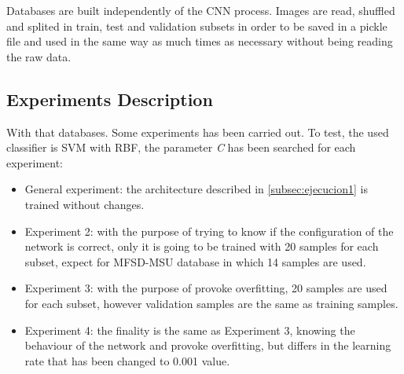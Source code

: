 Databases are built independently of the CNN process. Images are read, shuffled and splited in train, test and validation subsets in order to be saved in a pickle file and used in the same way as much times as necessary without being reading the raw data.

\subsection{Experiments Description} \label{sec:experiments_ejec1}
With that databases. Some experiments has been carried out. To test, the used classifier is SVM with RBF, the parameter \textit{C} has been searched for each experiment:
\begin{itemize}
\item General experiment: the architecture described in \ref{subsec:ejecucion1} is trained without changes.
\item Experiment 2: with the purpose of trying to know if the configuration of the network is correct, only it is going to be trained with 20 samples for each subset, expect for MFSD-MSU database in which 14 samples are used.
\item Experiment 3: with the purpose of provoke overfitting, 20 samples are used for each subset, however validation samples are the same as training samples.
\item Experiment 4: the finality is the same as Experiment 3, knowing the behaviour of the network and provoke overfitting, but differs in the learning rate that has been changed to 0.001 value. 
\end{itemize}

